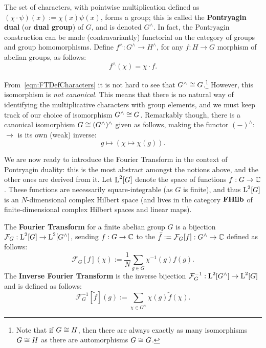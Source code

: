 The set of characters, with pointwise multiplication defined as $(\chi\cdot\psi)(x):=\chi(x)\psi(x)$, forms a group; this is called the \textbf{Pontryagin dual} (or \textbf{dual group}) of $G$, and is denoted $G^\wedge$. In fact, the Pontryagin construction can be made (contravariantly) functorial on the category  of groups and group homomorphisms. Define $f^\wedge : G^\wedge \rightarrow H^\wedge$, for any $f: H \rightarrow G$ morphism of abelian groups, as follows:
\begin{equation*}
  f^\wedge( \chi ) = \chi \cdot f.
\end{equation*}

From~\eqref{eqn:FTDefCharacters} it is not hard to see that $G^\wedge \cong G$.\footnote{Note that if $G \cong H$, then there are always exactly as many isomorphisms $G \cong H$ as there are automorphisms $G \cong G$.} However, this isomorphism is \emph{not canonical}. This means that there is no natural way of identifying the multiplicative characters with group elements, and we must keep track of our choice of isomorphism $G^\wedge \cong G$. Remarkably though, there is a canonical isomorphism $G \cong (G^\wedge)^\wedge$ given as follows, making the functor $(-)^{\wedge}:$  $\to$  is its own (weak) inverse:
\begin{equation*}
  g \mapsto (\chi \mapsto \chi(g)).
\end{equation*}

\newcommand{\FourierTransformSym}[1]{\mathcal{F}_{#1}}
\newcommand{\InverseFourierTransformSym}[1]{\mathcal{F}_{#1}^{-1}}
\newcommand{\FourierTransform}[1]{\mathcal{F}_G[#1]}
\newcommand{\InverseFourierTransform}[1]{\mathcal{F}_G^{-1}[#1]}

We are now ready to introduce the Fourier Transform in the context of Pontryagin duality: this is the most abstract amongst the notions above, and the other ones are derived from it. Let $\operatorname{L}^2[G]$ denote the space of functions $f:G\to \mathbb{C}$. These functions are necessarily square-integrable (as $G$ is finite), and thus $\operatorname{L}^2[G]$ is an $N$-dimensional complex Hilbert space (and lives in the category $\mathbf{FHilb}$ of finite-dimensional complex Hilbert spaces and linear maps). 

\begin{defn}
The \textbf{Fourier Transform} for a finite abelian group $G$ is a bijection $\mathcal{F}_G:\operatorname{L}^2[G]\rightarrow\operatorname{L}^2[G^\wedge]$, sending $f:G\to\mathbb{C}$ to the $\bar{f}:=\FourierTransform{f}:G^\wedge\to\complexs$ defined as follows:
\begin{equation}\label{eqn:DefTraditionalFT}
  \FourierTransform{f}(\chi) := \frac{1}{N}\sum_{g \in G}\chi^{-1}(g)f(g).
\end{equation}
The \textbf{Inverse Fourier Transform} is the inverse bijection $\mathcal{F}_G^{-1}: \operatorname{L}^2[G^\wedge] \rightarrow \operatorname{L}^2[G]$ and is defined as follows:
\begin{equation}\label{eqn:DefTraditionalInverseFT}
  \InverseFourierTransform{\tilde{f}}(g) := \sum_{\chi \in G^\wedge}\chi(g)\tilde{f}(\chi).
\end{equation}
\end{defn}

